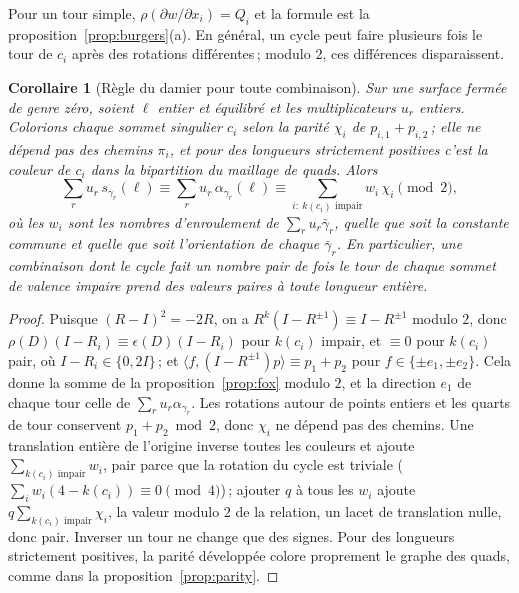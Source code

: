 \documentclass[11pt,a4paper]{article}
\newtheorem{corollary}{Corollaire}
\newcommand{\shift}{s}
\begin{document}
Pour un tour simple, $\rho(\partial w/\partial x_i) = Q_i$ et la formule est
la proposition~\ref{prop:burgers}(a). En général, un cycle peut faire
plusieurs fois le tour de $c_i$ après des rotations différentes\,; modulo
$2$, ces différences disparaissent.

\begin{corollary}[Règle du damier pour toute combinaison]\label{cor:checker}
Sur une surface fermée de genre zéro, soient $\ell$ entier et équilibré et les
multiplicateurs $u_r$ entiers. Colorions chaque sommet singulier $c_i$ selon
la parité $\chi_i$ de $p_{i,1} + p_{i,2}$\,; elle ne dépend pas des chemins
$\pi_i$, et pour des longueurs strictement positives c'est la couleur de $c_i$
dans la bipartition du maillage de quads. Alors
\[
  \sum_r u_r\, \shift_{\gamma_r}(\ell) \equiv \sum_r u_r\, \alpha_{\gamma_r}(\ell)
  \equiv \sum_{i:\ k(c_i) \text{ impair}} w_i\, \chi_i \pmod 2 ,
\]
où les $w_i$ sont les nombres d'enroulement de $\sum_r u_r \bar\gamma_r$,
quelle que soit la constante commune et quelle que soit l'orientation de
chaque $\bar\gamma_r$. En particulier, une combinaison dont le cycle fait un
nombre pair de fois le tour de chaque sommet de valence impaire prend des
valeurs paires à toute longueur entière.
\end{corollary}

\begin{proof}
Puisque $(R - I)^2 = -2R$, on a $R^k(I - R^{\pm1}) \equiv I - R^{\pm1}$
modulo $2$, donc $\rho(D)(I - R_i) \equiv \epsilon(D)(I - R_i)$ pour $k(c_i)$
impair, et $\equiv 0$ pour $k(c_i)$ pair, où $I - R_i \in \{0, 2I\}$\,; et
$\langle f, (I - R^{\pm1})p\rangle \equiv p_1 + p_2$ pour $f \in \{\pm e_1,
\pm e_2\}$. Cela donne la somme de la proposition~\ref{prop:fox} modulo $2$,
et la direction $e_1$ de chaque tour celle de $\sum_r u_r
\alpha_{\gamma_r}$. Les rotations autour de points entiers et les quarts de
tour conservent $p_1 + p_2 \bmod 2$, donc $\chi_i$ ne dépend pas des chemins.
Une translation entière de l'origine inverse toutes les couleurs et ajoute
$\sum_{k(c_i)\text{ impair}} w_i$, pair parce que la rotation du cycle est
triviale ($\sum_i w_i (4 - k(c_i)) \equiv 0 \pmod 4$)\,; ajouter $q$ à tous les
$w_i$ ajoute $q \sum_{k(c_i)\text{ impair}} \chi_i$, la valeur modulo $2$ de
la relation, un lacet de translation nulle, donc pair. Inverser un tour ne
change que des signes. Pour des longueurs strictement positives, la parité
développée colore proprement le graphe des quads, comme dans la
proposition~\ref{prop:parity}.
\end{proof}
\end{document}
